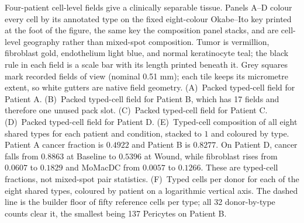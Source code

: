 Four-patient cell-level fields give a clinically separable tissue. Panels A--D colour every cell by its annotated type on the fixed eight-colour Okabe--Ito key printed at the foot of the figure, the same key the composition panel stacks, and are cell-level geography rather than mixed-spot composition. Tumor is vermillion, fibroblast gold, endothelium light blue, and normal keratinocyte teal; the black rule in each field is a scale bar with its length printed beneath it. Grey squares mark recorded fields of view (nominal 0.51 mm); each tile keeps its micrometre extent, so white gutters are native field geometry. (A)~Packed typed-cell field for Patient A. (B)~Packed typed-cell field for Patient B, which has 17 fields and therefore one unused pack slot. (C)~Packed typed-cell field for Patient C. (D)~Packed typed-cell field for Patient D. (E)~Typed-cell composition of all eight shared types for each patient and condition, stacked to \(1\) and coloured by type. Patient A cancer fraction is \(0.4922\) and Patient B is \(0.8277\). On Patient D, cancer falls from \(0.8863\) at Baseline to \(0.5396\) at Wound, while fibroblast rises from \(0.0607\) to \(0.1829\) and MoMacDC from \(0.0057\) to \(0.1266\). These are typed-cell fractions, not mixed-spot pair statistics. (F)~Typed cells per donor for each of the eight shared types, coloured by patient on a logarithmic vertical axis. The dashed line is the builder floor of fifty reference cells per type; all 32 donor-by-type counts clear it, the smallest being 137 Pericytes on Patient B.
